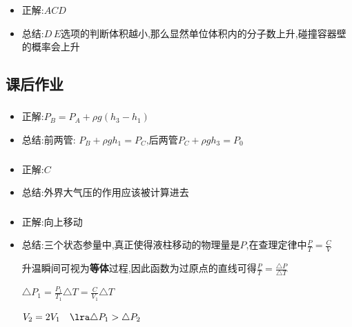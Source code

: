 \documentclass{article}
\begin{document}
\vspace{2em}

\subsubsection{}
\begin{itemize}
    \item 正解:\quad $ACD$
    \item 总结:\quad $D \, E$选项的判断体积越小,那么显然单位体积内的分子数上升,碰撞容器壁的概率会上升
\end{itemize}

\vspace{2em}

\subsection{课后作业}
\subsubsection{}
\begin{itemize}
    \item 正解:\quad $P_{B} = P_{A} + \rho g (h_{3} - h_{1}) $
    \item 总结:\quad 前两管: $ P_{B} + \rho g h_{1} = P_{C}\text{,后两管} P_{C} + \rho g h_{3} = P_{0}$
\end{itemize}

\vspace{2em}

\subsubsection{}
\begin{itemize}
    \item 正解:\quad $C$
    \item 总结:\quad 外界大气压的作用应该被计算进去
\end{itemize}

\vspace{2em}

\subsubsection{}
\begin{itemize}
    \item 正解:\quad 向上移动
    \item 总结:\quad 三个状态参量中,真正使得液柱移动的物理量是$P$,在查理定律中$\frac{P}{T} = \frac{C}{V}$

          \hspace{3.3em}升温瞬间可视为\textbf{等体}过程,因此函数为过原点的直线可得$\frac{P}{T} = \frac{\triangle P}{\triangle T}$

          \hspace{3.3em}$ \triangle P_{1} = \frac{P_{1}}{T_{1}} \triangle T = \frac{C}{V_{1}} \triangle T $

          \hspace{3.3em}$ V_{2} = 2 V_{1}  \quad \lra \triangle P_{1} > \triangle P_{2}$
\end{itemize}
\end{document}
